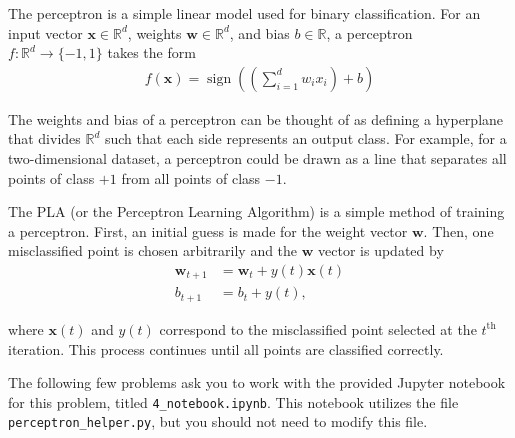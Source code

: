 The perceptron is a simple linear model used for binary classification. For an input vector $\mathbf{x} \in \mathbb{R}^d$, weights $\mathbf{w} \in \mathbb{R}^d$, and bias $b \in \mathbb{R}$, a perceptron $f: \mathbb{R}^d \rightarrow \{-1,1\}$ takes the form
\begin{align*}
  f(\mathbf{x}) = \operatorname{sign}\left(\left(\sum_{i=1}^d w_i x_i\right) + b \right)
\end{align*}

The weights and bias of a perceptron can be thought of as defining a hyperplane that divides $\mathbb{R}^d$ such that each side represents an output class. For example, for a two-dimensional dataset, a perceptron could be drawn as a line that separates all points of class $+1$ from all points of class $-1$.

The PLA (or the Perceptron Learning Algorithm) is a simple method of training a perceptron. First, an initial guess is made for the weight vector $\mathbf{w}$. Then, one misclassified point is chosen arbitrarily and the $\mathbf{w}$ vector is updated by
\begin{align*}
  \mathbf{w}_{t+1} &= \mathbf{w}_t + y(t)\mathbf{x}(t) \\
  b_{t + 1} &= b_t + y(t),
\end{align*}

where $\mathbf{x}(t)$ and $y(t)$ correspond to the misclassified point selected at the $t^\text{th}$ iteration.
This process continues until all points are classified correctly.

The following few problems ask you to work with the provided Jupyter notebook for this problem, titled \texttt{4_notebook.ipynb}. This notebook utilizes the file \texttt{perceptron_helper.py}, but you should not need to modify this file.

